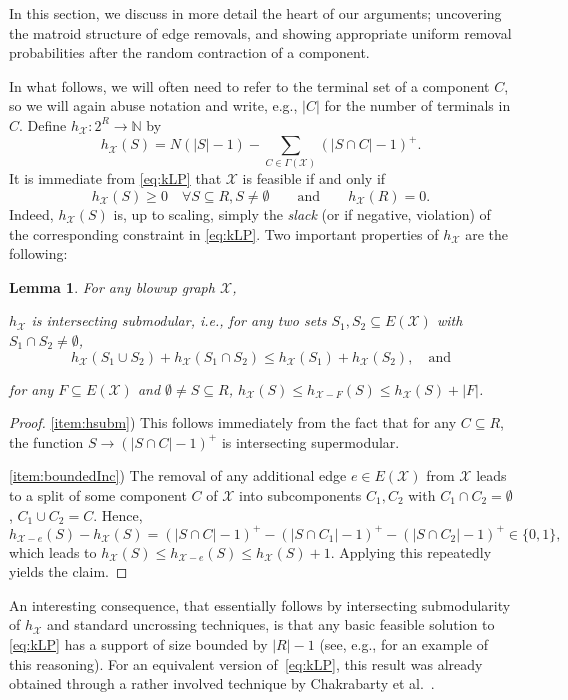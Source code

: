 \documentclass[11pt, letterpaper]{article}
\newtheorem{lemma}[theorem]{Lemma}
\theoremstyle{definition}
\newcommand{\grphx}{\mathcal{X}}
\newcommand{\compof}[1]{\Gamma(#1)}
\newcommand{\compx}{\compof{\grphx}}
\newcommand{\slk}{h}
\newcommand{\slkx}{h_{\grphx}}
\newcommand{\remove}{-}
\newcommand{\grd}{E(\grphx)}
\begin{document}
In this section, we discuss in more detail the heart of our arguments; uncovering the matroid structure of edge removals, and showing appropriate uniform removal probabilities after the random contraction of a component.

In what follows, we will often need to refer to the terminal set of a component $C$, so we will again abuse notation and write, e.g., $|C|$ for the number of terminals in $C$.
Define $\slkx : 2^R \rightarrow \mathbb{N}$ by
\begin{equation}\label{eq:h}
	\slkx(S)  = N(|S|-1) - \sum_{C\in \compx}  (|S\cap C|-1)^+. 
\end{equation}
It is immediate from \eqref{eq:kLP} that $\grphx$ is feasible if and only if
\begin{equation}\label{eq:constraints}
	\slkx(S) \geq 0 \quad \forall S \subseteq R, S \neq \emptyset \quad\quad \text{and} \quad\quad \slkx(R) = 0.
\end{equation}
Indeed, $\slkx(S)$ is, up to scaling, simply the \emph{slack} (or if negative, violation) of the corresponding constraint in \eqref{eq:kLP}.
Two important properties of $\slkx$ are the following:
\begin{lemma}\label{lem:hsubm}
For any blowup graph $\grphx$, 
\begin{compactenum}[i)]
\item\label{item:hsubm}	
	$\slkx$ is intersecting submodular, i.e., for any two sets $S_1, S_2 \subseteq \grd$ with $S_1 \cap S_2 \neq \emptyset$, \[ \slkx(S_1 \cup S_2) + \slkx(S_1 \cap S_2) \leq \slkx(S_1) + \slkx(S_2), \quad \text{and} \]
\item\label{item:boundedInc} for any $F \subseteq E(\grphx)$ and $\emptyset \neq S\subseteq R$,
$\slkx(S)\leq \slk_{\grphx \remove F}(S)\leq \slkx(S)+|F|$.
\end{compactenum}
\end{lemma}
\begin{proof}
\ref{item:hsubm})
	This follows immediately from the fact that for any $C \subseteq R$, the function $S \rightarrow (|S\cap C|-1)^+$ is intersecting supermodular.

	\ref{item:boundedInc})
The removal of any additional edge $e\in E(\grphx)$ from $\grphx$ leads to a split of some component $C$ of $\grphx$ into
subcomponents $C_1,C_2$ with $C_1\cap C_2 = \emptyset$,
$C_1\cup C_2=C$. Hence,
\[ \slk_{\grphx - e}(S)-\slkx(S)=(|S\cap C|-1)^+ - (|S\cap C_1|-1)^+ -(|S\cap C_2|-1)^+ \in \{0,1\}, \]
which leads to $\slkx(S)\leq \slk_{\grphx - e}(S) \leq \slkx(S)+1$. Applying this repeatedly yields the claim.
\end{proof}
An interesting consequence, that essentially follows by intersecting submodularity of $\slkx$
and standard uncrossing techniques, is that any basic feasible solution to
\eqref{eq:kLP} has a support of size bounded by $|R|-1$
(see, e.g., \cite{goemans_2006_minimum} for an example of this reasoning).
For an equivalent version of~\eqref{eq:kLP}, this result was already
obtained through a rather involved technique by
Chakrabarty et al.~\cite{chakrabarty_2010_hypergraphic}.
\end{document}
